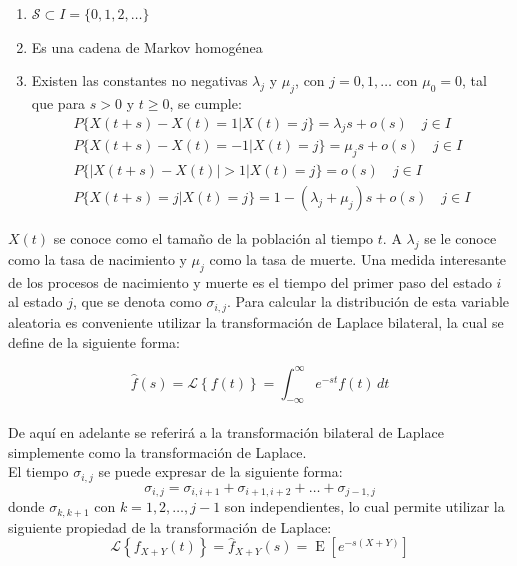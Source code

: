 \documentclass[11pt]{article}
\numberwithin{equation}{section} %
\begin{document}
\begin{enumerate}
  \item $\mathcal{S} \subset I = \{ 0,1,2,\ldots\}$
  \item Es una cadena de Markov homogénea
  \item Existen las constantes no negativas $\lambda_j$ y $\mu_j$, con $j=0,1,\ldots$ con $\mu_0=0$, tal que para $s>0$ y $t\geq 0$, se cumple:
\begin{subequations}
\begin{eqnarray}
P\{X(t+s)-X(t)=1|X(t)=j\} = \lambda_j s + o(s)\quad j \in I \\
P\{X(t+s)-X(t)=-1|X(t)=j\} = \mu_js + o(s)\quad j \in I \\
P\{\left|X(t+s)-X(t)\right|>1|X(t)=j\} = o(s)\quad j \in I \\
P\{X(t+s)=j|X(t)=j\} = 1-(\lambda_j+\mu_j)s + o(s)\quad j \in I 
\end{eqnarray}
\end{subequations}
\end{enumerate}


$X(t)$ se conoce como el tamaño de la población al tiempo $t$. A $\lambda_j$ se le conoce como la tasa de nacimiento y $\mu_j$ como la tasa de muerte. Una medida interesante de los procesos de nacimiento y muerte es el tiempo del primer paso del estado $i$ al estado $j$, que se denota como $\sigma_{i,j}$. Para calcular la distribución de esta variable aleatoria es conveniente utilizar la transformación de Laplace bilateral, la cual se define de la siguiente forma:

\begin{equation}
\hat{f}(s) = \mathcal{L} \left\{f(t)\right\}=\int_{-\infty}^{\infty} e^{-st} f(t) \,dt
\end{equation}\\

De aquí en adelante se referirá a la transformación bilateral de Laplace simplemente como la transformación de Laplace.\\

El tiempo $\sigma_{i,j}$ se puede expresar de la siguiente forma:
\begin{equation}
\sigma_{i,j}=\sigma_{i,i+1}+\sigma_{i+1,i+2}+\ldots+\sigma_{j-1,j}
\end{equation}
donde $\sigma_{k,k+1}$ con $k=1,2,\ldots,j-1$ son independientes, lo cual permite utilizar la siguiente propiedad de la transformación de Laplace:
\begin{equation}
\mathcal{L} \left\{f_{X+Y}(t)\right\}=\hat{f}_{X+Y}(s)=\operatorname{E}[e^{-s(X+Y)}]
\end{equation}
\end{document}
